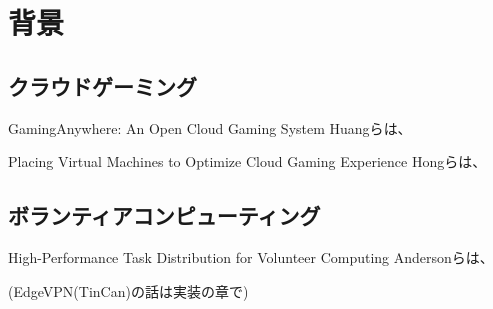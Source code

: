 \section{背景}

\subsection{クラウドゲーミング}

GamingAnywhere: An Open Cloud Gaming System
Huangら\cite{gaminganywhere}は、


Placing Virtual Machines to Optimize
Cloud Gaming Experience
Hongら\cite{placing}は、


\subsection{ボランティアコンピューティング}
High-Performance Task Distribution for Volunteer Computing 
Andersonら\cite{boinc}は、


(EdgeVPN(TinCan)の話は実装の章で)